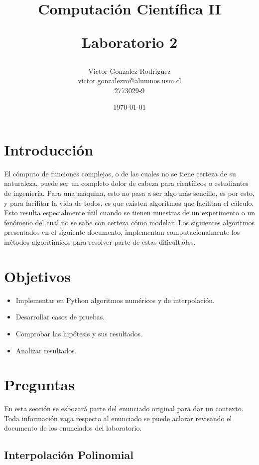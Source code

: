 \documentclass[12pt,letterpaper]{article}
\begin{document}
\title{Computación Científica II \\ \begin{Large}Laboratorio 2\end{Large}} 
\author{Victor Gonzalez Rodriguez\\victor.gonzalezro@alumnos.usm.cl\\2773029-9}
\date{\today}
\maketitle

\section{Introducción}
El cómputo de funciones complejas, o de las cuales no se tiene certeza de su naturaleza, puede ser un completo dolor de cabeza para científicos o estudiantes de ingeniería. Para una máquina, esto no pasa a ser algo más sencillo, es por esto, y para facilitar la vida de todos, es que existen algoritmos que facilitan el cálculo. Esto resulta especialmente útil cuando se tienen muestras de un experimento o un fenómeno del cual no se sabe con certeza cómo modelar. Los siguientes algoritmos presentados en el siguiente documento, implementan computacionalmente los métodos algorítimicos para resolver parte de estas dificultades.

\section{Objetivos}
\begin{itemize}
\item Implementar en Python algoritmos numéricos y de interpolación.
\item Desarrollar casos de pruebas.
\item Comprobar las hipótesis y sus resultados.
\item Analizar resultados.
\end{itemize}

\newpage
\section{Preguntas}
En esta sección se esbozará parte del enunciado original para dar un contexto. Toda información vaga respecto al enunciado se puede aclarar revisando el documento de los enunciados del laboratorio.

\subsection{Interpolación Polinomial}
\end{document}
